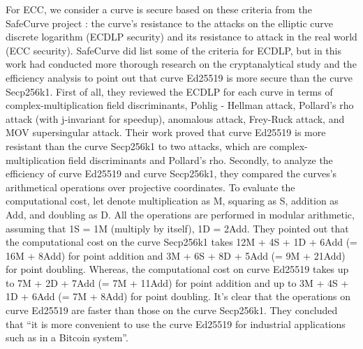 For ECC, we consider a curve is secure based on these criteria from the SafeCurve project \cite{safecurves}: the curve’s resistance to the attacks on the elliptic curve discrete logarithm (ECDLP security) and its resistance to attack in the real world (ECC security). SafeCurve did list some of the criteria for ECDLP, but in this work \cite{Semmouni-2020} had conducted more thorough research on the cryptanalytical study and the efficiency analysis to point out that curve Ed25519 is more secure than the curve Secp256k1. First of all, they reviewed the ECDLP for each curve in terms of complex-multiplication field discriminants, Pohlig - Hellman attack, Pollard’s rho attack (with j-invariant for speedup), anomalous attack, Frey-Ruck attack, and MOV supersingular attack. Their work proved that curve Ed25519 is more resistant than the curve Secp256k1 to two attacks, which are complex-multiplication field discriminants and Pollard’s rho. Secondly, to analyze the efficiency of curve Ed25519 and curve Secp256k1, they compared the curves’s arithmetical operations over projective coordinates. To evaluate the computational cost, let denote multiplication as M, squaring as S, addition as Add, and doubling as D. All the operations are performed in modular arithmetic, assuming that 1S = 1M (multiply by itself), 1D = 2Add. They pointed out that the computational cost on the curve Secp256k1 takes 12M + 4S + 1D + 6Add (= 16M + 8Add) for point addition and 3M + 6S + 8D + 5Add (= 9M + 21Add) for point doubling. Whereas, the computational cost on curve Ed25519 takes up to 7M + 2D + 7Add (= 7M + 11Add) for point addition and up to 3M + 4S + 1D + 6Add (= 7M + 8Add) for point doubling. It’s clear that the operations on curve Ed25519 are faster than those on the curve Secp256k1. They concluded that “it is more convenient to use the curve Ed25519 for industrial applications such as in a Bitcoin system”.

